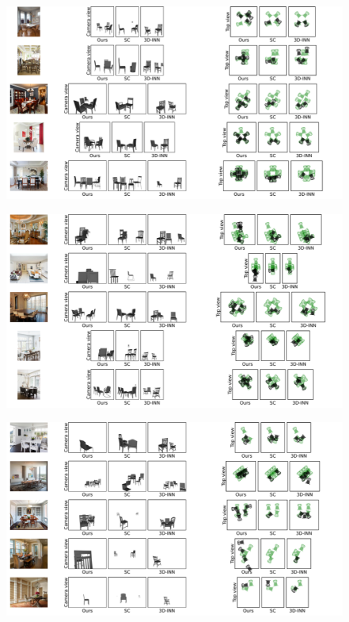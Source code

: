 \begin{figure}
    \includegraphics[width=\textwidth]{figures/qualitative_results/full/qual_results_6.pdf}
\end{figure}
\begin{figure}
    \includegraphics[width=\textwidth]{figures/qualitative_results/full/qual_results_7.pdf}
\end{figure}
\begin{figure}
    \includegraphics[width=\textwidth]{figures/qualitative_results/full/qual_results_8.pdf}
\end{figure}
